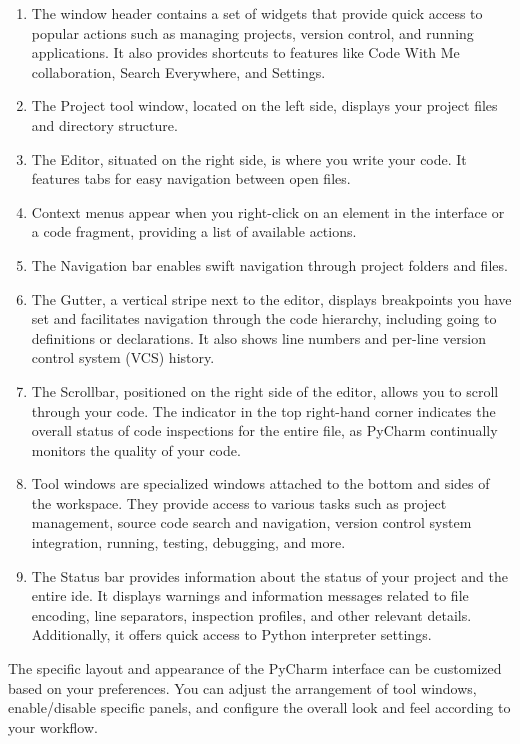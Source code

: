 \begin{enumerate}
	\item The window header contains a set of widgets that provide quick access to popular actions such as managing projects, version control, and running applications. It also provides shortcuts to features like Code With Me collaboration, Search Everywhere, and Settings.
	\item The Project tool window, located on the left side, displays your project files and directory structure.
	\item The Editor, situated on the right side, is where you write your code. It features tabs for easy navigation between open files.
	\item Context menus appear when you right-click on an element in the interface or a code fragment, providing a list of available actions.
	\item The Navigation bar enables swift navigation through project folders and files.
	\item The Gutter, a vertical stripe next to the editor, displays breakpoints you have set and facilitates navigation through the code hierarchy, including going to definitions or declarations. It also shows line numbers and per-line version control system (VCS) history.
	\item The Scrollbar, positioned on the right side of the editor, allows you to scroll through your code. The indicator in the top right-hand corner indicates the overall status of code inspections for the entire file, as PyCharm continually monitors the quality of your code.
	\item Tool windows are specialized windows attached to the bottom and sides of the workspace. They provide access to various tasks such as project management, source code search and navigation, version control system integration, running, testing, debugging, and more.
	\item The Status bar provides information about the status of your project and the entire \ac{ide}. It displays warnings and information messages related to file encoding, line separators, inspection profiles, and other relevant details. Additionally, it offers quick access to Python interpreter settings.
\end{enumerate}


The specific layout and appearance of the PyCharm interface can be customized based on your preferences. You can adjust the arrangement of tool windows, enable/disable specific panels, and configure the overall look and feel according to your workflow.

